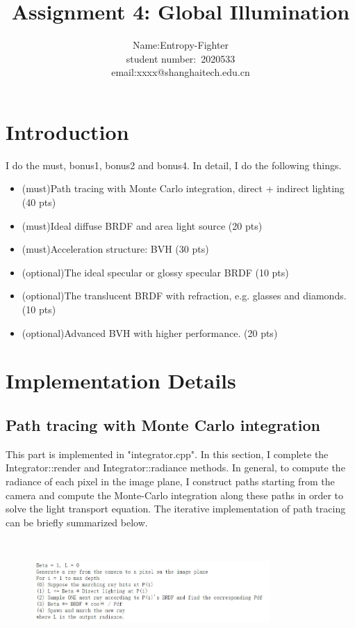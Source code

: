 \documentclass[acmtog]{acmart}
\title{Assignment 4: {Global Illumination}}
\author{Name:\quad Entropy-Fighter\\ student number:\ 2020533
\\email:\quad xxxx@shanghaitech.edu.cn}
\begin{document}
\maketitle

\vspace*{2 ex}

\section{Introduction}
\quad I do the must, bonus1, bonus2 and bonus4. In detail, I do the following things.
\begin{itemize}
\item (must)Path tracing with Monte Carlo integration, direct + indirect lighting (40 pts)
\item (must)Ideal diffuse BRDF and area light source (20 pts)
\item (must)Acceleration structure: BVH (30 pts)
\item (optional)The ideal specular or glossy specular BRDF (10 pts)
\item (optional)The translucent BRDF with refraction, e.g. glasses and diamonds. (10 pts)
\item (optional)Advanced BVH with higher performance. (20 pts)
\end{itemize}

\section{Implementation Details}
\subsection{Path tracing with Monte Carlo integration}
\quad This part is implemented in "integrator.cpp".
In this section, I complete the Integrator::render and Integrator::radiance methods. In general, to compute the radiance of each pixel in the image plane, I construct paths starting from the camera and compute the Monte-Carlo integration along these paths in order to solve the light transport equation. The iterative implementation of path tracing can be briefly summarized below.

\begin{figure}[h]
	\centering
	{\includegraphics[width=9cm, height=4cm]{mc.JPG}}	
\end{figure}
\end{document}
